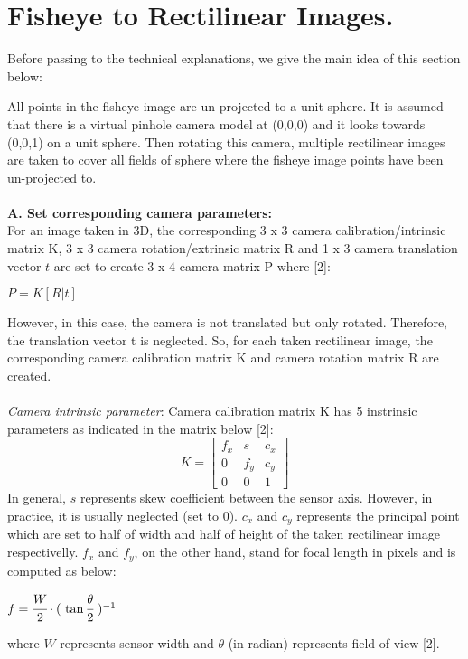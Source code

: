 \documentclass{article}
\begin{document}
\section*{Fisheye to Rectilinear Images.}
Before passing to the technical explanations, we give the main idea of this section below:

All points in the fisheye image are un-projected to a unit-sphere. It is assumed that there is a virtual pinhole camera model at (0,0,0) and it looks  towards (0,0,1) on a unit sphere. Then rotating this camera, multiple rectilinear images are taken to cover all fields of sphere where the fisheye image points have been un-projected to. \\~\\
\textbf{A. Set corresponding camera parameters:}
\ \\
For an image taken in 3D, the corresponding 3 x 3 camera calibration/intrinsic matrix K,  3 x 3 camera rotation/extrinsic matrix R and 1 x 3 camera translation vector $t$ are set to create 3 x 4 camera matrix P where [2]:
\begin{center}
				$P = K[R | t]$
\end{center}
However, in this case, the camera is not translated but only rotated. Therefore, the translation vector t is neglected. So, for each taken rectilinear image, the corresponding camera calibration matrix K and camera rotation matrix R are created.\\~\\
\textit{Camera intrinsic parameter}:	
Camera calibration matrix K has 5 instrinsic parameters as indicated in the matrix below [2]: 
\begin{equation*}
    K = \begin{bmatrix}
			f_{x} & s & c_{x}\\
			0 & f_{y} & c_{y}\\
            0 & 0 & 1
			\end{bmatrix}
\end{equation*} 				
In general, $s$ represents skew coefficient between the sensor axis. However, in practice, it is usually neglected (set to 0). $c_{x}$ and $c_{y}$ represents the principal point which are set to half of width and half of height of the taken rectilinear image respectivelly. $f_{x}$ and $f_{y}$, on the other hand, stand for focal length in pixels and is computed as below:
\begin{center}
	$f = \cfrac{W}{2} \cdot (\ \tan \cfrac{\theta}{2} \ )^{-1}$
\end{center}
where $W$ represents sensor width and $\theta$ (in radian) represents field of view [2].
\end{document}
